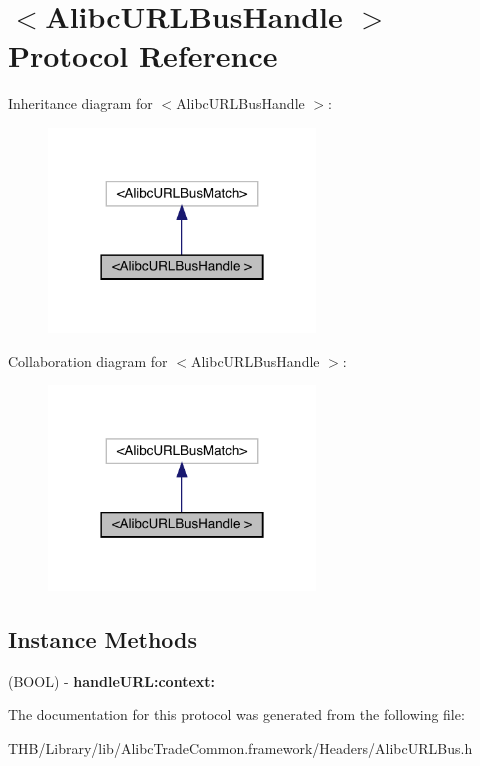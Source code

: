 \hypertarget{protocol_alibc_u_r_l_bus_handle_01-p}{}\section{$<$Alibc\+U\+R\+L\+Bus\+Handle $>$ Protocol Reference}
\label{protocol_alibc_u_r_l_bus_handle_01-p}


Inheritance diagram for $<$Alibc\+U\+R\+L\+Bus\+Handle $>$\+:\nopagebreak
\begin{figure}[H]
\begin{center}
\leavevmode
\includegraphics[width=201pt]{protocol_alibc_u_r_l_bus_handle_01-p__inherit__graph}
\end{center}
\end{figure}


Collaboration diagram for $<$Alibc\+U\+R\+L\+Bus\+Handle $>$\+:\nopagebreak
\begin{figure}[H]
\begin{center}
\leavevmode
\includegraphics[width=201pt]{protocol_alibc_u_r_l_bus_handle_01-p__coll__graph}
\end{center}
\end{figure}
\subsection*{Instance Methods}
\begin{DoxyCompactItemize}
\item 
\mbox{\label{protocol_alibc_u_r_l_bus_handle_01-p_a4210c2e77188ba19d7f0e589d8b60ad8}} 
(B\+O\+OL) -\/ {\bfseries handle\+U\+R\+L\+:context\+:}
\end{DoxyCompactItemize}


The documentation for this protocol was generated from the following file\+:\begin{DoxyCompactItemize}
\item 
T\+H\+B/\+Library/lib/\+Alibc\+Trade\+Common.\+framework/\+Headers/Alibc\+U\+R\+L\+Bus.\+h\end{DoxyCompactItemize}
